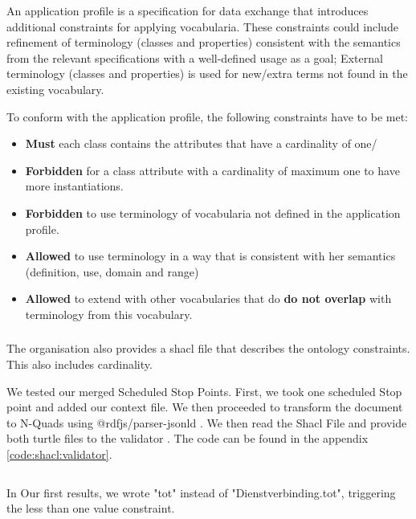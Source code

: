 An application profile is a specification for data exchange that introduces additional constraints for applying vocabularia. These constraints could include refinement of terminology (classes and properties) consistent with the semantics from the relevant specifications with a well-defined usage as a goal;
    External terminology (classes and properties) is used for new/extra terms not found in the existing vocabulary.

To conform with the  application profile, the following constraints have to be met:
\begin{itemize}
    \item \textbf{Must} each class contains the attributes that have a cardinality of one/
    \item \textbf{Forbidden} for a class attribute with a cardinality of maximum one to have more instantiations.
    \item \textbf{Forbidden} to use terminology of vocabularia not defined in the application profile.
    \item \textbf{Allowed} to use terminology in a way that is consistent with her semantics (definition, use, domain and range)
    \item \textbf{Allowed} to extend with other vocabularies that do \textbf{do not overlap} with terminology from this vocabulary. 
\end{itemize}
\subsubsection{}

The  organisation also provides a shacl file that describes the ontology constraints. This also includes cardinality.

We tested our merged Scheduled Stop Points. First, we took one scheduled Stop point and added our context file. We then proceeded to transform the  document to N-Quads using @rdfjs/parser-jsonld \cite{noauthor_rdfjs-baseparser-jsonld_2024}. We then read the Shacl File and provide both turtle files to the  validator \cite{noauthor_rdf-validate-shacl_2024}. The code can be found in the appendix \autoref{code:shacl:validator}.

\begin{listing}[H]
    \inputminted[frame=single,linenos,breaklines]{JSON}{code/shacl_1.json}
    \caption{In Our first results, we wrote "tot" instead of "Dienstverbinding.tot", triggering the less than one value constraint.}
    \label{code:json:shacl}
\end{listing}


